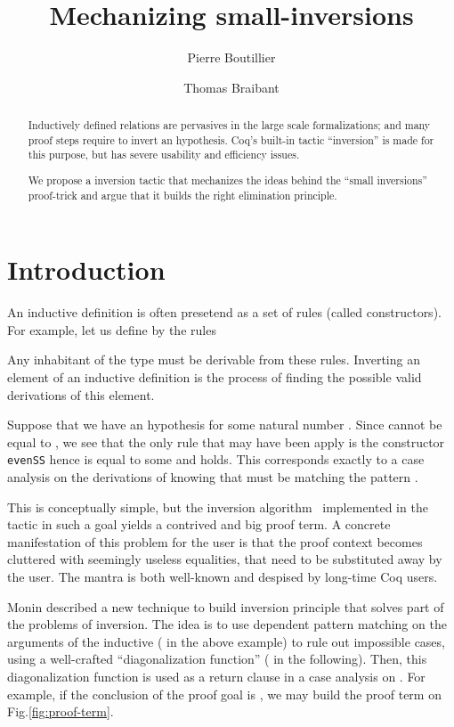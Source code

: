 \documentclass{llncs}
\title{Mechanizing small-inversions}
\author{Pierre Boutillier \and Thomas Braibant}
\institute{Inria Paris Rocquencourt}
\begin{document}
\maketitle
\begin{abstract}
  Inductively defined relations are pervasives in the large scale
  formalizations; and many proof steps require to invert an
  hypothesis. Coq's built-in tactic ``inversion'' is made for this
  purpose, but has severe usability and efficiency issues. 
  
  We propose a inversion tactic that mechanizes the ideas behind
  the ``small inversions'' proof-trick \cite{monin} and argue that it
  builds the right elimination principle.  
\end{abstract}
\section*{Introduction}

An inductive definition is often presetend as a set of rules (called
constructors). For example, let us define  by the rules
\newcommand\even{\mathtt{even}}
Any inhabitant of the type  must be derivable from these
rules. Inverting an element of an inductive definition is the process
of finding the possible valid derivations of this element. 

Suppose that we have an hypothesis  for some natural
number . Since  cannot be equal to , we see
that the only rule that may have been apply is the constructor
\texttt{evenSS} hence  is equal to some  and
 holds. This corresponds exactly to a case analysis on
the derivations of  knowing that  must be
matching the pattern . 

This is conceptually simple, but the inversion algorithm~\cite{cornes}
implemented in the  tactic in such a goal yields a
contrived and big proof term. A concrete manifestation of this problem
for the user is that the proof context becomes cluttered with
seemingly useless equalities, that need to be substituted away by the
user. The mantra  is both well-known
and despised by long-time Coq users.
 
Monin \cite{monin} described a new technique to build inversion
principle that solves part of the problems of inversion. The idea is
to use dependent pattern matching on the arguments of the inductive
( in the above example) to rule out impossible cases, using
a well-crafted ``diagonalization function'' ( in the
following). Then, this diagonalization function is used as a return
clause in a case analysis on . For example, if the
conclusion of the proof goal is , we may build the
proof term on Fig.\ref{fig:proof-term}. 
\end{document}
